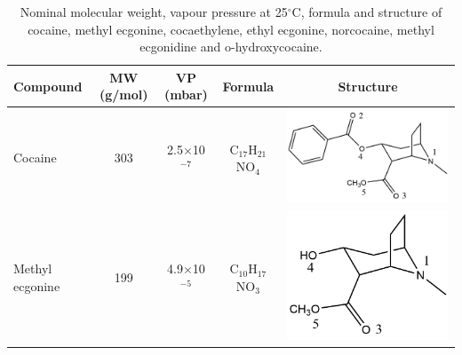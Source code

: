\begin{table}
\centering
\caption{Nominal molecular weight, vapour pressure at 25$^\circ$C, formula and structure of cocaine, methyl ecgonine, cocaethylene, ethyl ecgonine, norcocaine, methyl ecgonidine and o-hydroxycocaine.}
\begin{tabular}{lcccc}
\textbf{Compound} &  \textbf{MW (g/mol)} & \textbf{VP (mbar)} & \textbf{Formula} & \textbf{Structure} \\ 
\toprule
Cocaine &   303 &2.5$\times$10$^{-7}$ &  C$_{17}$H$_{21}$NO$_4$ & \begin{minipage}[c]{0.26\linewidth}\centering \includegraphics[width=\linewidth]{pics/cocaine-chapter/COC_struct.png}\end{minipage}\\ \midrule
Methyl ecgonine & 199 & 4.9$\times$10$^{-5}$& C$_{10}$H$_{17}$NO$_3$ & \begin{minipage}[c]{0.26\linewidth}\centering \includegraphics[width=.8\linewidth]{pics/cocaine-chapter/MeEcg_struct.png} \end{minipage} \\ \midrule

\end{tabular}
\end{table}
